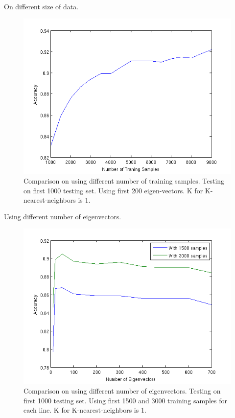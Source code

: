 \documentclass[10pt]{article}
\begin{document}
On different size of data.

\begin{figure}[b]
\centering
\includegraphics[width=0.8\columnwidth]{diffDataSet.png}
\caption{Comparison on using different number of training samples.
Testing on first 1000 testing set. Using first 200 eigen-vectors. K
for K-nearest-neighbors is 1.}
\label{fig:dataset}
\end{figure}

Using different number of eigenvectors.

\begin{figure}[b]
\centering
\includegraphics[width=0.8\columnwidth]{diffEVector.png}
\caption{Comparison on using different number of eigenvectors.
Testing on first 1000 testing set. Using first 1500 and 3000 training
samples for each line.  K for K-nearest-neighbors is 1.}
\label{fig:evec}
\end{figure}
\end{document}
